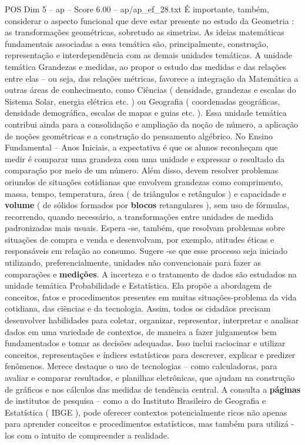\begin{textsample}{POS Dim 5 – ap – Score 6.00 – ap/ap\_ef\_28.txt}
É importante, também, considerar o aspecto funcional que deve estar presente no estudo da Geometria : as transformações geométricas, sobretudo as simetrias.
As ideias matemáticas fundamentais associadas a essa temática são, principalmente, construção, representação e interdependência com as demais unidades temáticas.
A unidade temática Grandezas e medidas, ao propor o estudo das medidas e das relações entre elas – ou seja, das relações métricas, favorece a integração da Matemática a outras áreas de conhecimento, como Ciências ( densidade, grandezas e escalas do Sistema Solar, energia elétrica etc. ) ou Geografia ( coordenadas geográficas, densidade demográfica, escalas de mapas e guias etc. ).
Essa unidade temática contribui ainda para a consolidação e ampliação da noção de número, a aplicação de noções geométricas e a construção do pensamento algébrico.
No Ensino Fundamental – Anos Iniciais, a expectativa é que os alunos reconheçam que medir é comparar uma grandeza com uma unidade e expressar o resultado da comparação por meio de um número.
Além disso, devem resolver problemas oriundos de situações cotidianas que envolvem grandezas como comprimento, massa, tempo, temperatura, área ( de triângulos e retângulos ) e capacidade e \textbf{volume} ( de sólidos formados por \textbf{blocos} retangulares ), sem uso de fórmulas, recorrendo, quando necessário, a transformações entre unidades de medida padronizadas mais usuais.
Espera -se, também, que resolvam problemas sobre situações de compra e venda e desenvolvam, por exemplo, atitudes éticas e responsáveis em relação ao consumo.
Sugere -se que esse processo seja iniciado utilizando, preferencialmente, unidades não convencionais para fazer as comparações e \textbf{medições}.
A incerteza e o tratamento de dados são estudados na unidade temática Probabilidade e Estatística.
Ela propõe a abordagem de conceitos, fatos e procedimentos presentes em muitas situações-problema da vida cotidiana, das ciências e da tecnologia.
Assim, todos os cidadãos precisam desenvolver habilidades para coletar, organizar, representar, interpretar e analisar dados em uma variedade de contextos, de maneira a fazer julgamentos bem fundamentados e tomar as decisões adequadas.
Isso inclui raciocinar e utilizar conceitos, representações e índices estatísticos para descrever, explicar e predizer fenômenos.
Merece destaque o uso de tecnologias – como calculadoras, para avaliar e comparar resultados, e planilhas eletrônicas, que ajudam na construção de gráficos e nos cálculos das medidas de tendência central.
A consulta a \textbf{páginas} de institutos de pesquisa – como a do Instituto Brasileiro de Geografia e Estatística ( IBGE ), pode oferecer contextos potencialmente ricos não apenas para aprender conceitos e procedimentos estatísticos, mas também para utilizá -los com o intuito de compreender a realidade.

\end{textsample}
